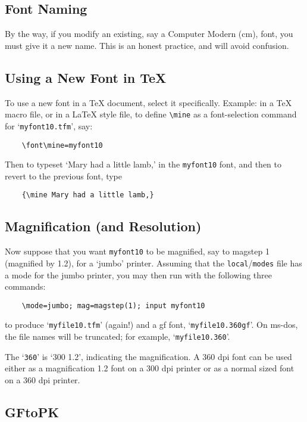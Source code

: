 \subsection{Font Naming}\label{sub:naming}

By the way, if you modify an existing, say a {\sc Computer
Modern (cm)}, font, you must give it a new name.  This is an honest
practice, and will avoid confusion.


\subsection{Using a New Font in \TeX{}}\label{sub:tex}

To use a new font in a \TeX{} document, select it specifically.
Example:  in a \TeX{} macro file, or in a \LaTeX{} style file,
to define \verb+\mine+ as a font-selection command for
`{\tt myfont10.tfm}', say:
\begin{verbatim}
    \font\mine=myfont10
\end{verbatim}

Then to typeset `Mary had a little lamb,' in the {\tt myfont10} font,
and then to revert to the previous font, type
\begin{verbatim}
    {\mine Mary had a little lamb,}
\end{verbatim}


\subsection{Magnification (and Resolution)}\label{sub:mag}

Now suppose that you want {\tt myfont10} to be magnified,
say to magstep 1 (magnified by 1.2), for a `jumbo' printer.
Assuming that the {\tt local}/{\tt modes} file has a mode
for the jumbo printer,
you may then run \MF{} with the following three commands:
\begin{verbatim}
    \mode=jumbo; mag=magstep(1); input myfont10
\end{verbatim}
to produce `{\tt myfile10.tfm}' (again!)
and a {\sc gf} font, `{\tt myfile10.360gf}'.
On {\sc ms-dos}, the file names will be truncated;
for example, `{\tt myfile10.360}'.

The `{\tt 360}' is `300 {\tt *} 1.2', indicating the magnification.
A 360 dpi font can be used either as a magnification 1.2 font on
a 300 dpi printer or as a normal sized font on a 360 dpi printer.


\subsection{{\sf GFtoPK}}\label{sub:gftopk}

